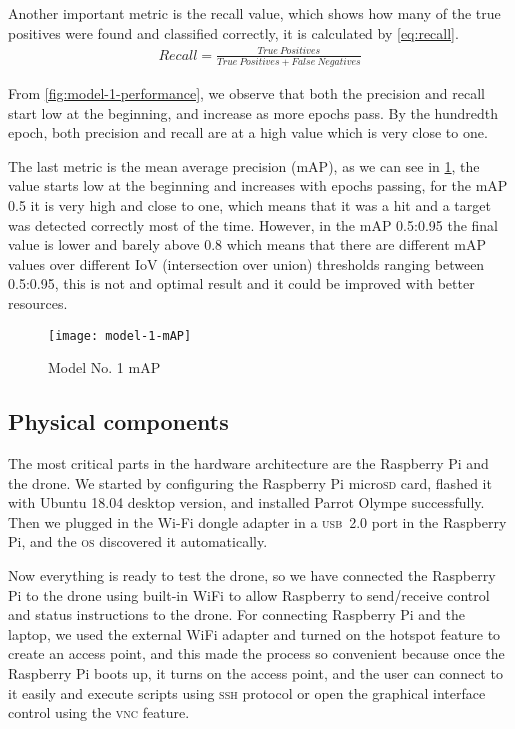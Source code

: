 \documentclass[../main.tex]{subfiles}
\begin{document}
Another important metric is the recall value, which shows how many of the 
true positives were found and classified correctly, it is calculated by \cref{eq:recall}.
%
\begin{align}
    Recall =  \frac{True\ Positives}{True\ Positives + False\ Negatives} \label{eq:recall}
\end{align}

From \cref{fig:model-1-performance}, we observe that both the precision and recall start low 
at the beginning, and increase as more epochs pass. By the hundredth 
epoch, both precision and recall are at a high value which is very close 
to one.  

The last metric is the mean average precision (mAP), as we can see in 
\cref{fig:model-1-mAP}, the value starts low at the beginning and 
increases with epochs passing, for the mAP 0.5 it is very high and close
to one, which means that it was a hit and a target was detected 
correctly most of the time. However, in the mAP 0.5:0.95 the final value 
is lower and barely above 0.8 which means that there are different mAP 
values over different IoV (intersection over union) thresholds ranging 
between 0.5:0.95, this is not and optimal result and it could be 
improved with better resources.

\begin{figure}[tbp] 
	\centering
	\texttt{[image: model-1-mAP]} 
	\caption{Model No. 1 mAP} \label{fig:model-1-mAP} 
\end{figure}

\subsection{Physical components}

The most critical parts in the hardware
architecture are the Raspberry Pi and the drone. 
We started by configuring the Raspberry Pi micro\textsc{sd} card,
flashed it with Ubuntu 18.04 desktop version,
and installed Parrot Olympe successfully. 
Then we plugged in the Wi-Fi dongle adapter
in a \textsc{usb}~2.0 port in the Raspberry Pi, 
and the \textsc{os} discovered it automatically. 

Now everything is ready to test the 
\anafi drone, so we have connected the
Raspberry Pi to the drone using built-in WiFi
to allow Raspberry to send/receive control and status 
instructions to the drone. 
For connecting Raspberry Pi and the laptop, 
we used the external WiFi adapter and turned 
on the hotspot feature to create an access point,
and this made the process so convenient because 
once the Raspberry Pi boots up, it turns on the 
access point, and the user can connect to it 
easily and execute scripts using \textsc{ssh} 
protocol or open the graphical interface 
control using the \textsc{vnc} feature.
\end{document}
